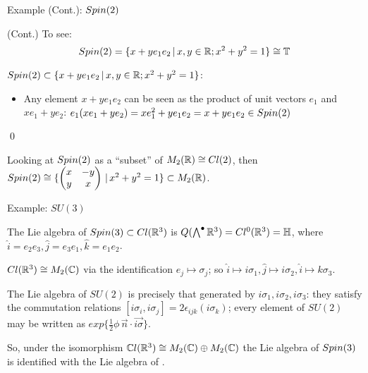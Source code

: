 \begin{frame}{Example (Cont.): $Spin(2)$} %
    
    (Cont.) To see: \[Spin(2) = \{x + y e_1 e_2 \,|\, x, y \in \mathbb R;  x^2 + y^2 = 1\} \cong \mathbb T\]
    
    $Spin(2) \subset \{x + y e_1 e_2 \,|\, x, y \in \mathbb R;  x^2 + y^2 = 1\}$:
        
        \begin{itemize}
        
        \item Any element $x + y e_1 e_2$ can be seen as the product of unit vectors $e_1$ and $x e_1 + y e_2$: $e_1 (x e_1 + y e_2) = x e_1^2 + y e_1 e_2 = x + y e_1 e_2 \in Spin(2)$
            
        \end{itemize}
    \qed
    
    Looking at $Spin(2)$ as a ``subset'' of $M_2(\mathbb R) \cong Cl(2)$, then $Spin(2) \cong \{\begin{pmatrix} x & -y \\ y & x \end{pmatrix} \,|\, x^2 + y^2 = 1\} \subset M_2(\mathbb R)$.
    
\end{frame}

\begin{frame}{Example: $SU(3)$} %

    The Lie algebra of $Spin(3) \subset Cl(\mathbb R^3)$ is $Q(\bigwedge^\bullet \mathbb R^3) = Cl^0(\mathbb R^3) = \mathbb H$, where $\hat i = e_2 e_3, \hat j = e_3 e_1, \hat k = e_1 e_2$.
    
    $Cl(\mathbb R^3) \cong M_2(\mathbb C)$ via the identification $e_j \mapsto \sigma_j$; so $\hat i \mapsto i \sigma_1, \hat j \mapsto i \sigma_2, \hat i \mapsto k \sigma_3$.
    
    The Lie algebra of $SU(2)$ is precisely that generated by $i\sigma_1, i\sigma_2, i\sigma_3$: they satisfy the commutation relations $[i\sigma_i, i \sigma_j] = 2 \epsilon_{ijk} (i \sigma_k)$; every element of $SU(2)$ may be written as $exp\{\frac{1}{2} \phi \, \vec n \cdot \vec{i \sigma}\}$.
    
    So, under the isomorphism $\mathbb C l(\mathbb R^3) \cong M_2(\mathbb C) \oplus M_2(\mathbb C)$ the Lie algebra of $Spin(3)$ is identified with the Lie algebra of .
    
\end{frame}


